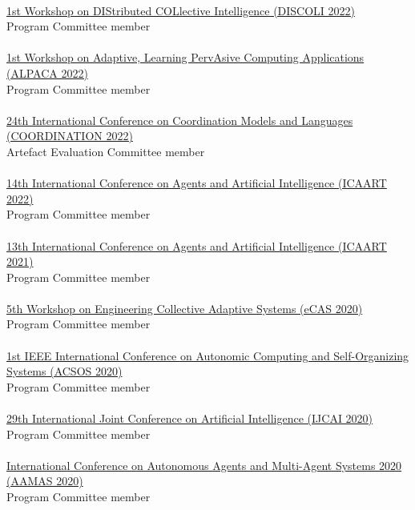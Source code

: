 \halfblankline \\
\href{https://discoli-workshop.github.io/2022/}{1st Workshop on DIStributed COLlective Intelligence
(DISCOLI 2022)}
\\ Program Committee member \\
\halfblankline \\
\href{https://www.discotec.org/2022/coordination}{1st Workshop on Adaptive, Learning PervAsive Computing Applications
(ALPACA 2022)}
\\ Program Committee member \\
\halfblankline \\
\href{https://www.discotec.org/2022/coordination}{24th International Conference on Coordination Models and Languages 
(COORDINATION 2022)}
\\ Artefact Evaluation Committee member \\
\halfblankline \\
\href{http://www.icaart.org/?y=2022}{14th International Conference on Agents and Artificial Intelligence 
(ICAART 2022)}
\\ Program Committee member \\
\halfblankline \\
\href{http://www.icaart.org/?y=2021}{13th International Conference on Agents and Artificial Intelligence 
(ICAART 2021)}
\\ Program Committee member \\
\halfblankline \\
\href{http://archive.vn/wip/38Ah6}{5th Workshop on Engineering Collective Adaptive Systems (eCAS 2020)}
\\ Program Committee member \\
\halfblankline \\
\href{https://conf.researchr.org/home/acsos-2020}{1st IEEE International Conference on Autonomic Computing and Self-Organizing Systems (ACSOS 2020)}
\\ Program Committee member \\
\halfblankline \\
\href{https://https://ijcai20.org/}{29th International Joint Conference on Artificial Intelligence (IJCAI 2020)}
\\ Program Committee member \\
\halfblankline \\
\href{https://aamas2020.conference.auckland.ac.nz/program-committee-members/}{International Conference on Autonomous Agents and Multi-Agent Systems 2020 (AAMAS 2020)}
\\ Program Committee member \\
